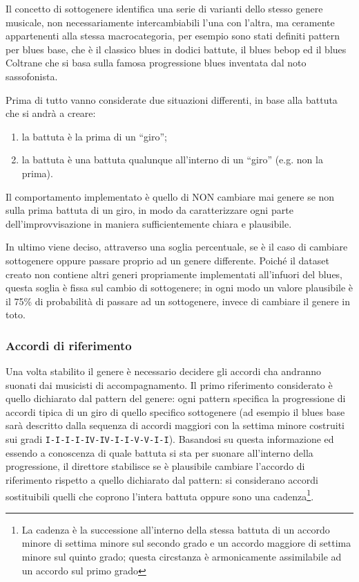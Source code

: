 Il concetto di sottogenere identifica una serie di varianti dello stesso genere musicale, non necessariamente intercambiabili l'una con l'altra, ma ceramente appartenenti alla stessa macrocategoria, per esempio sono stati definiti pattern per blues base, che è il classico blues in dodici battute, il blues bebop ed il blues Coltrane che si basa sulla famosa progressione blues inventata dal noto sassofonista.

Prima di tutto vanno considerate due situazioni differenti, in base alla battuta che si andrà a creare:
\begin{enumerate}
\item la battuta è la prima di un ``giro'';
\item la battuta è una battuta qualunque all'interno di un ``giro'' (e.g. non la prima).
\end{enumerate}

Il comportamento implementato è quello di NON cambiare mai genere se non sulla prima battuta di un giro, in modo da caratterizzare ogni parte dell'improvvisazione in maniera sufficientemente chiara e plausibile. 

In ultimo viene deciso, attraverso una soglia percentuale, se è il caso di cambiare sottogenere oppure passare proprio ad un genere differente.
Poiché il dataset creato non contiene altri generi propriamente implementati all'infuori del blues, questa soglia è fissa sul cambio di sottogenere; in ogni modo un valore plausibile è il 75\% di probabilità di passare ad un sottogenere, invece di cambiare il genere in toto.

\subsubsection{Accordi di riferimento}
Una volta stabilito il genere è necessario decidere gli accordi cha andranno suonati dai musicisti di accompagnamento.
Il primo riferimento considerato è quello dichiarato dal pattern del genere: ogni pattern specifica la progressione di accordi tipica di un giro di quello specifico sottogenere (ad esempio il blues base sarà descritto dalla sequenza di accordi maggiori con la settima minore costruiti sui gradi \texttt{I-I-I-I-IV-IV-I-I-V-V-I-I}).
Basandosi su questa informazione ed essendo a conoscenza di quale battuta si sta per suonare all'interno della progressione, il direttore stabilisce se è plausibile cambiare l'accordo di riferimento rispetto a quello dichiarato dal pattern: si considerano accordi sostituibili quelli che coprono l'intera battuta oppure sono una cadenza\footnote{La cadenza è la successione all'interno della stessa battuta di un accordo minore di settima minore sul secondo grado e un accordo maggiore di settima minore sul quinto grado; questa circstanza è armonicamente assimilabile ad un accordo sul primo grado}.

